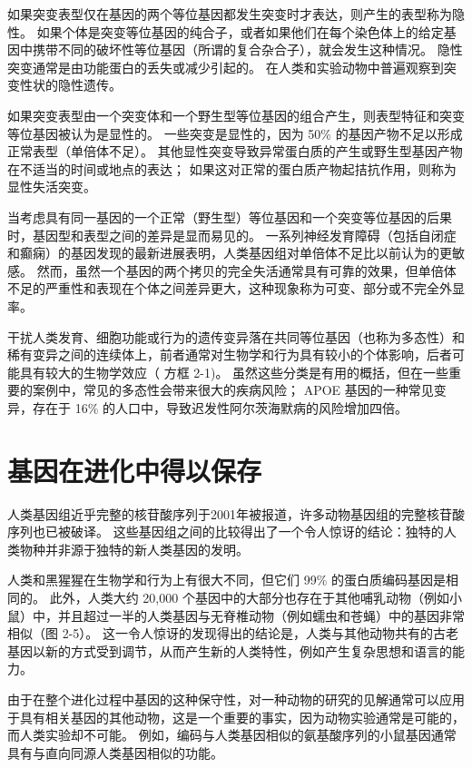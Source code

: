 如果突变表型仅在基因的两个等位基因都发生突变时才表达，则产生的表型称为隐性。 如果个体是突变等位基因的纯合子，或者如果他们在每个染色体上的给定基因中携带不同的破坏性等位基因（所谓的复合杂合子），就会发生这种情况。 隐性突变通常是由功能蛋白的丢失或减少引起的。 在人类和实验动物中普遍观察到突变性状的隐性遗传。

如果突变表型由一个突变体和一个野生型等位基因的组合产生，则表型特征和突变等位基因被认为是显性的。 一些突变是显性的，因为 50\% 的基因产物不足以形成正常表型（单倍体不足）。 其他显性突变导致异常蛋白质的产生或野生型基因产物在不适当的时间或地点的表达； 如果这对正常的蛋白质产物起拮抗作用，则称为显性失活突变。

当考虑具有同一基因的一个正常（野生型）等位基因和一个突变等位基因的后果时，基因型和表型之间的差异是显而易见的。 一系列神经发育障碍（包括自闭症和癫痫）的基因发现的最新进展表明，人类基因组对单倍体不足比以前认为的更敏感。 然而，虽然一个基因的两个拷贝的完全失活通常具有可靠的效果，但单倍体不足的严重性和表现在个体之间差异更大，这种现象称为可变、部分或不完全外显率。

干扰人类发育、细胞功能或行为的遗传变异落在共同等位基因（也称为多态性）和稀有变异之间的连续体上，前者通常对生物学和行为具有较小的个体影响，后者可能具有较大的生物学效应（ 方框 2-1)。 虽然这些分类是有用的概括，但在一些重要的案例中，常见的多态性会带来很大的疾病风险； APOE 基因的一种常见变异，存在于 16\% 的人口中，导致迟发性阿尔茨海默病的风险增加四倍。

\section{基因在进化中得以保存}

人类基因组近乎完整的核苷酸序列于2001年被报道，许多动物基因组的完整核苷酸序列也已被破译。 这些基因组之间的比较得出了一个令人惊讶的结论：独特的人类物种并非源于独特的新人类基因的发明。

人类和黑猩猩在生物学和行为上有很大不同，但它们 99\% 的蛋白质编码基因是相同的。 此外，人类大约 20,000 个基因中的大部分也存在于其他哺乳动物（例如小鼠）中，并且超过一半的人类基因与无脊椎动物（例如蠕虫和苍蝇）中的基因非常相似（图 2-5）。 这一令人惊讶的发现得出的结论是，人类与其他动物共有的古老基因以新的方式受到调节，从而产生新的人类特性，例如产生复杂思想和语言的能力。

由于在整个进化过程中基因的这种保守性，对一种动物的研究的见解通常可以应用于具有相关基因的其他动物，这是一个重要的事实，因为动物实验通常是可能的，而人类实验却不可能。 例如，编码与人类基因相似的氨基酸序列的小鼠基因通常具有与直向同源人类基因相似的功能。

